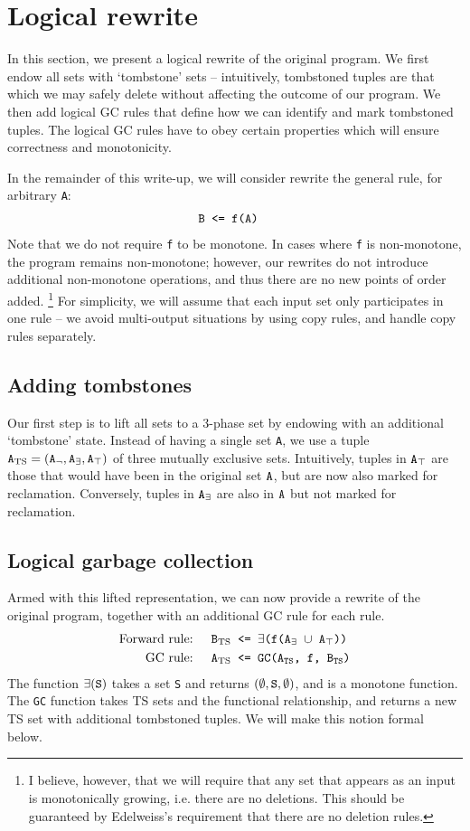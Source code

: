 \documentclass[10pt]{proc}
\numberwithin{equation}{section}
\renewcommand{\tt}[1]{\ifmmode\text{\texttt{#1}}\else\texttt{#1}\fi}
\begin{document}
\section{Logical rewrite}
In this section, we present a logical rewrite of the original program.
We first endow all sets with `tombstone' sets -- intuitively, tombstoned tuples are that which we may safely delete without affecting the outcome of our program.
We then add logical GC rules that define how we can identify and mark tombstoned tuples.
The logical GC rules have to obey certain properties which will ensure correctness and monotonicity.

In the remainder of this write-up, we will consider rewrite the general rule, for arbitrary \tt{A}:
\begin{align}
\tt{B} &\tt{ <= f(A)}
\end{align}
Note that we do not require \tt{f} to be monotone.
In cases where \tt{f} is non-monotone, the program remains non-monotone; however, our rewrites do not introduce additional non-monotone operations, and thus there are no new points of order added.
\footnote{I believe, however, that we will require that any set that appears as an input is monotonically growing, i.e. there are no deletions. This should be guaranteed by Edelweiss's requirement that there are no deletion rules.}
For simplicity, we will assume that each input set only participates in one rule -- we avoid multi-output situations by using copy rules, and handle copy rules separately.

\subsection{Adding tombstones}
Our first step is to lift all sets to a 3-phase set by endowing with an additional `tombstone' state.
Instead of having a single set \tt{A}, we use a tuple $\tt{A}_\text{TS} = (\tt{A}_\neg, \tt{A}_\exists, \tt{A}_\top)$ of three mutually exclusive sets.
Intuitively, tuples in $\tt{A}_\top$ are those that would have been in the original set $\tt{A}$, but are now also marked for reclamation.
Conversely, tuples in $\tt{A}_\exists$ are also in $\tt{A}$ but not marked for reclamation.


\subsection{Logical garbage collection}
Armed with this lifted representation, we can now provide a rewrite of the original program, together with an additional GC rule for each rule.
\begin{align}
\text{Forward rule: } && \tt{B}_\text{TS} &\tt{ <= $\exists$(f(A$_\exists$ $\cup$ A$_\top$))}\label{eq:forwardrule}\\
\text{GC rule: } && \tt{A}_\text{TS} &\tt{ <= GC(A$_\text{TS}$, f, B$_\text{TS}$)}\label{eq:gcrule}
\end{align}
The function $\exists(\tt{S})$ takes a set \tt{S} and returns $(\emptyset, \tt{S}, \emptyset)$, and is a monotone function.
The \tt{GC} function takes TS sets and the functional relationship, and returns a new TS set with additional tombstoned tuples.
We will make this notion formal below.
\end{document}
